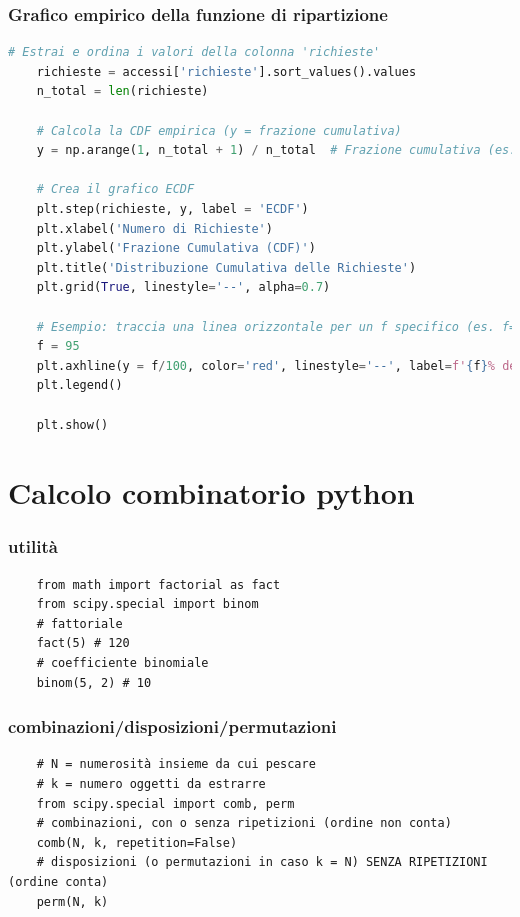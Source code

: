 \documentclass{article}
\begin{document}
\subsubsection*{Grafico empirico della funzione di ripartizione}

\begin{lstlisting}[language=Python]
    # Estrai e ordina i valori della colonna 'richieste'
    richieste = accessi['richieste'].sort_values().values
    n_total = len(richieste)

    # Calcola la CDF empirica (y = frazione cumulativa)
    y = np.arange(1, n_total + 1) / n_total  # Frazione cumulativa (es. 0.2, 0.4, ..., 1.0)

    # Crea il grafico ECDF
    plt.step(richieste, y, label = 'ECDF')
    plt.xlabel('Numero di Richieste')
    plt.ylabel('Frazione Cumulativa (CDF)')
    plt.title('Distribuzione Cumulativa delle Richieste')
    plt.grid(True, linestyle='--', alpha=0.7)

    # Esempio: traccia una linea orizzontale per un f specifico (es. f=95%)
    f = 95
    plt.axhline(y = f/100, color='red', linestyle='--', label=f'{f}% dei casi')
    plt.legend()

    plt.show()
\end{lstlisting}

\section{Calcolo combinatorio python}

\subsubsection*{utilità}

\begin{lstlisting}
    from math import factorial as fact
    from scipy.special import binom
    # fattoriale
    fact(5) # 120
    # coefficiente binomiale
    binom(5, 2) # 10
\end{lstlisting}

\subsubsection*{combinazioni/disposizioni/permutazioni}

\begin{lstlisting}
    # N = numerosità insieme da cui pescare
    # k = numero oggetti da estrarre
    from scipy.special import comb, perm
    # combinazioni, con o senza ripetizioni (ordine non conta)
    comb(N, k, repetition=False)
    # disposizioni (o permutazioni in caso k = N) SENZA RIPETIZIONI (ordine conta)
    perm(N, k)
\end{lstlisting}
\end{document}

